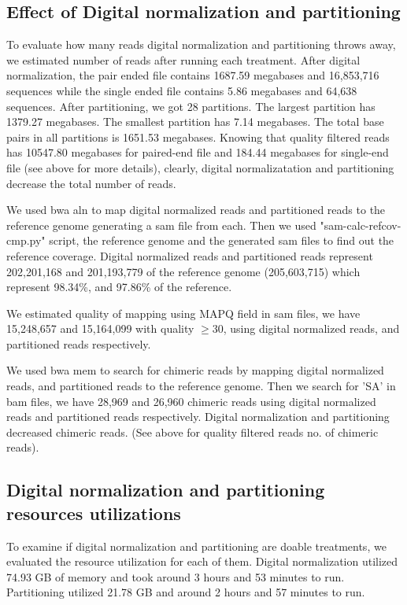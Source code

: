\subsection *{Effect of Digital normalization and partitioning} 
To evaluate how many reads digital normalization and partitioning throws away, we estimated number of reads after running each treatment. 
After digital normalization, the pair ended file contains 1687.59 megabases and 16,853,716 sequences  while the single ended file contains 5.86 megabases and 64,638 sequences. 
After partitioning, we got 28 partitions. The largest partition has 1379.27 megabases. The smallest partition has 7.14 megabases. The total base pairs in all partitions is 1651.53 megabases. 
Knowing that quality filtered reads has 10547.80 megabases for paired-end file and 184.44  megabases for single-end file (see above for more details), clearly, digital normalizatation and partitioning decrease the total number of reads.  


We used bwa aln \cite{bwa-mem} to map digital normalized reads and partitioned reads to the reference genome generating a sam file from each. Then we used  "sam-calc-refcov-cmp.py" script, the reference genome and the generated sam files to find out the reference coverage. Digital normalized reads and partitioned reads represent  202,201,168 and 201,193,779 of the reference genome (205,603,715)  which represent 98.34\%, and 97.86\%  of the reference.   


We estimated quality of mapping using MAPQ field in sam files, we have 15,248,657 and 15,164,099 with quality $\geq 30$,  using  digital normalized reads, and partitioned reads respectively. 

We used bwa mem to search for chimeric reads by mapping digital normalized reads, and partitioned reads to the reference genome. Then we search for 'SA' in bam files, we have 28,969 and  26,960 chimeric reads using digital normalized reads and partitioned reads respectively. Digital normalization and partitioning decreased chimeric reads. (See above for quality filtered reads no. of chimeric reads). 

\subsection*{Digital normalization and partitioning resources utilizations}
To examine if digital normalization and partitioning are doable treatments, we evaluated the resource utilization for each of them. Digital normalization utilized 74.93  GB of memory and took  around 3 hours and 53 minutes to run. Partitioning utilized 21.78 GB and around 2 hours  and 57 minutes to run. 

